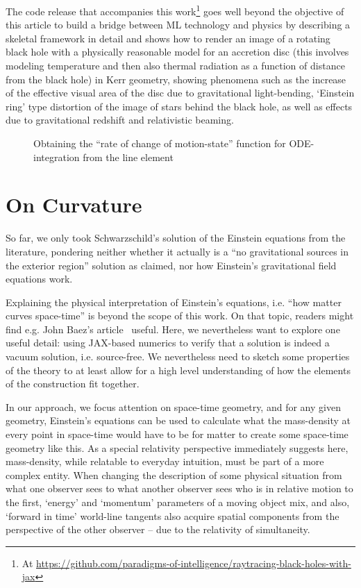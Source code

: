 \documentclass[twocolumn]{article}
\begin{document}
The code release that accompanies this work\footnote{At \url{https://github.com/paradigms-of-intelligence/raytracing-black-holes-with-jax}}
goes well beyond the objective of this article to build a bridge between ML technology and
physics by describing a skeletal framework in detail and shows how to
render an image of a rotating black hole with a physically reasonable
model for an accretion disc (this involves modeling temperature and
then also thermal radiation as a function of distance from the black
hole) in Kerr geometry, showing phenomena such as the increase of the
effective visual area of the disc due to gravitational light-bending,
`Einstein ring' type distortion of the image of stars behind the black
hole, as well as effects due to gravitational redshift and
relativistic beaming.

\begin{figure}[ht]

\caption{Obtaining the ``rate of change of motion-state'' function for ODE-integration from the line element}
\label{fig:geodesic-ode}
\end{figure}


\section{On Curvature}\label{sec:curvature}

So far, we only took Schwarzschild's solution of the Einstein
equations from the literature, pondering neither whether it actually
is a ``no gravitational sources in the exterior region'' solution as
claimed, nor how Einstein's gravitational field equations work.

Explaining the physical interpretation of Einstein's equations,
i.e. ``how matter curves space-time'' is beyond the scope of this
work. On that topic, readers might find e.g. John Baez's
article~\cite{baez2005meaning} useful. Here, we nevertheless want to
explore one useful detail: using JAX-based numerics to verify that a
solution is indeed a vacuum solution, i.e. source-free. We
nevertheless need to sketch some properties of the theory to at least
allow for a high level understanding of how the elements of the
construction fit together.

In our approach, we focus attention on space-time geometry, and for
any given geometry, Einstein's equations can be used to calculate what
the mass-density at every point in space-time would have to be for
matter to create some space-time geometry like this. As a special
relativity perspective immediately suggests here, mass-density, while
relatable to everyday intuition, must be part of a more complex
entity. When changing the description of some physical situation from
what one observer sees to what another observer sees who is in
relative motion to the first, `energy' and `momentum' parameters of a
moving object mix, and also, `forward in time' world-line tangents
also acquire spatial components from the perspective of the other
observer -- due to the relativity of simultaneity.
\end{document}

